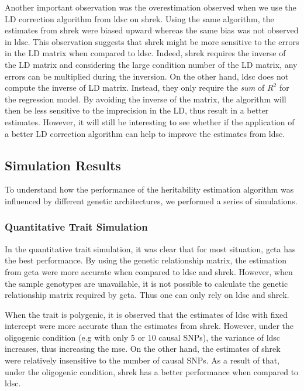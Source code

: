 	Another important observation was the overestimation observed when we use the \gls{LD} correction algorithm from \gls{ldsc} on \gls{shrek}. 
	Using the same algorithm, the estimates from \gls{shrek} were biased upward whereas the same bias was not observed in \gls{ldsc}.
	This observation suggests that \gls{shrek} might be more sensitive to the errors in the \gls{LD} matrix when compared to \gls{ldsc}.
	Indeed, \gls{shrek} requires the inverse of the \gls{LD} matrix and considering the large condition number of the \gls{LD} matrix, any errors can be multiplied during the inversion.
	On the other hand, \gls{ldsc} does not compute the inverse of \gls{LD} matrix.
	Instead, they only require the \emph{sum} of $R^2$ for the regression model.
	By avoiding the inverse of the matrix, the algorithm will then be less sensitive to the imprecision in the \gls{LD}, thus result in a better estimates.
	However, it will still be interesting to see whether if the application of a better \gls{LD} correction algorithm can help to improve the estimates from \gls{ldsc}.
	

	\subsection{Simulation Results}
	To understand how the performance of the heritability estimation algorithm was influenced by different genetic architectures, we performed a series of simulations.
	
	\subsubsection{Quantitative Trait Simulation}
	In the quantitative trait simulation, it was clear that for most situation, \gls{gcta} has the best performance.
	By using the genetic relationship matrix, the estimation from \gls{gcta} were more accurate when compared to \gls{ldsc} and \gls{shrek}.
	However, when the sample genotypes are unavailable, it is not possible to calculate the genetic relationship matrix required by \gls{gcta}. 
	Thus one can only rely on \gls{ldsc} and \gls{shrek}.
	
	When the trait is polygenic, it is observed that the estimates of \gls{ldsc} with fixed intercept were more accurate than the estimates from \gls{shrek}. 
	However, under the oligogenic condition (e.g with only 5 or 10 causal \glspl{SNP}), the variance of \gls{ldsc} increases, thus increasing the \gls{mse}.
	On the other hand, the estimates of \gls{shrek} were relatively insensitive to the number of causal \glspl{SNP}.
	As a result of that, under the oligogenic condition, \gls{shrek} has a better performance when compared to \gls{ldsc}.
	

